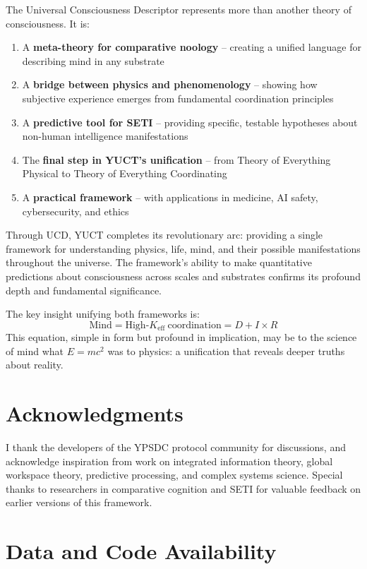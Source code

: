 \documentclass[12pt,a4paper]{article}
\newcommand{\Ke}{K_{\mathrm{eff}}}
\begin{document}
	The Universal Consciousness Descriptor represents more than another theory of consciousness. It is:
	\begin{enumerate}
		\item A \textbf{meta-theory for comparative noology} -- creating a unified language for describing mind in any substrate
		\item A \textbf{bridge between physics and phenomenology} -- showing how subjective experience emerges from fundamental coordination principles
		\item A \textbf{predictive tool for SETI} -- providing specific, testable hypotheses about non-human intelligence manifestations
		\item The \textbf{final step in YUCT's unification} -- from Theory of Everything Physical to Theory of Everything Coordinating
		\item A \textbf{practical framework} -- with applications in medicine, AI safety, cybersecurity, and ethics
	\end{enumerate}
	
	Through UCD, YUCT completes its revolutionary arc: providing a single framework for understanding physics, life, mind, and their possible manifestations throughout the universe. The framework's ability to make quantitative predictions about consciousness across scales and substrates confirms its profound depth and fundamental significance.
	
	The key insight unifying both frameworks is:
	\[
	\boxed{\text{Mind} = \text{High-}\Ke\ \text{coordination} = D + I \times R}
	\]
	This equation, simple in form but profound in implication, may be to the science of mind what \(E = mc^2\) was to physics: a unification that reveals deeper truths about reality.
	
	\section*{Acknowledgments}
	
	I thank the developers of the YPSDC protocol community for discussions, and acknowledge inspiration from work on integrated information theory, global workspace theory, predictive processing, and complex systems science. Special thanks to researchers in comparative cognition and SETI for valuable feedback on earlier versions of this framework.
	
	\section*{Data and Code Availability}
	
\end{document}

